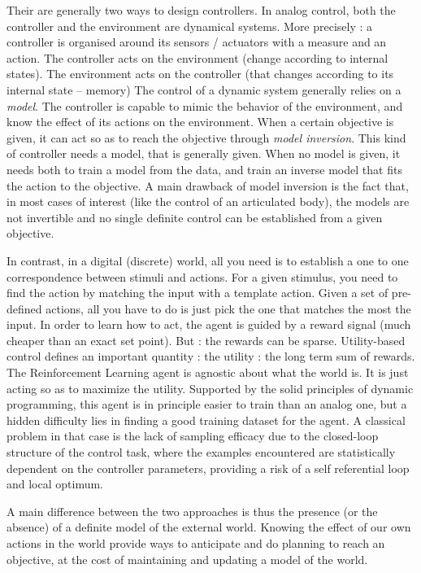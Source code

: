 \documentclass[runningheads]{llncs}
\begin{document}
Their are generally two ways to design controllers.  
In analog control, both the controller and the environment are dynamical systems. 
More precisely : a controller is organised around its sensors / actuators with a measure and 
an action. The controller acts on the environment (change according to internal states). 
The environment acts on the controller (that changes according to its internal state -- memory)
The control of a dynamic system generally relies on a \emph{model}. The controller is capable to mimic the
behavior of the environment, and know the effect of its actions on the environment. When a certain objective is given, it can 
act so as to reach the objective through \emph{model inversion}.
This kind of controller needs a model, that is generally given. When no model is given, it needs both to train a model from 
the data, and train an inverse model that fits the action to the objective.
A main drawback of model inversion is the fact that, in most cases of interest (like the control of an articulated body), the models are not invertible and no single definite control can be established from a given objective. 

In contrast, in a digital (discrete) world, all you
need is to establish a one to one correspondence between stimuli and actions. For a given stimulus, you need to find the action by
matching the input with a template action. Given a set of pre-defined actions, all you have to do is just pick the one that matches the most the input.  
In order to learn how to act, the agent is guided by a reward signal (much cheaper than an exact set point).
But : the rewards can be sparse.
Utility-based control defines an important quantity : the utility : the long term sum of rewards.
The Reinforcement Learning agent is agnostic about what the world is. It is just acting so as to maximize the utility.
Supported by the solid principles of dynamic programming, this agent is in principle easier to train than an analog one, but
a hidden difficulty lies in finding a good training dataset for the agent. A classical problem in that case is the lack of sampling efficacy due to the closed-loop structure of the control task, where the examples encountered are statistically dependent on the controller parameters, 
providing a risk of a self referential loop and local optimum.

A main difference between the two approaches is thus the presence (or the absence) of a definite model of the external world.   Knowing the effect of our own actions in the world provide ways to anticipate and do planning to reach an objective, at the cost of maintaining and updating a model of the world. 
\end{document}
